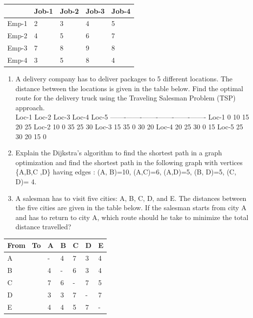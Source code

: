 \documentclass[
  letterpaper,
  DIV=11,
  numbers=noendperiod]{scrreprt}
\begin{document}
\begin{longtable}[]{@{}lllll@{}}
\toprule\noalign{}
& Job-1 & Job-2 & Job-3 & Job-4 \\
\midrule\noalign{}
\endhead
\bottomrule\noalign{}
\endlastfoot
Emp-1 & 2 & 3 & 4 & 5 \\
Emp-2 & 4 & 5 & 6 & 7 \\
Emp-3 & 7 & 8 & 9 & 8 \\
Emp-4 & 3 & 5 & 8 & 4 \\
\end{longtable}

\begin{enumerate}
\def\labelenumi{\arabic{enumi}.}
\setcounter{enumi}{8}
\item
  A delivery company has to deliver packages to 5 different locations.
  The distance between the locations is given in the table below. Find
  the optimal route for the delivery truck using the Traveling Salesman
  Problem (TSP) approach.\\
  \textbar{} \textbar{} Loc-1 \textbar{} Loc-2 \textbar{} Loc-3
  \textbar{} Loc-4 \textbar{} Loc-5 \textbar{}
  \textbar-------\textbar-------\textbar-------\textbar-------\textbar-------\textbar-------\textbar{}
  \textbar{} Loc-1 \textbar{} 0 \textbar{} 10 \textbar{} 15 \textbar{}
  20 \textbar{} 25 \textbar{} \textbar{} Loc-2 \textbar{} 10 \textbar{}
  0 \textbar{} 35 \textbar{} 25 \textbar{} 30 \textbar{} \textbar{}
  Loc-3 \textbar{} 15 \textbar{} 35 \textbar{} 0 \textbar{} 30
  \textbar{} 20 \textbar{} \textbar{} Loc-4 \textbar{} 20 \textbar{} 25
  \textbar{} 30 \textbar{} 0 \textbar{} 15 \textbar{} \textbar{} Loc-5
  \textbar{} 25 \textbar{} 30 \textbar{} 20 \textbar{} 15 \textbar{} 0
  \textbar{}
\item
  Explain the Dijkstra's algorithm to find the shortest path in a graph
  optimization and find the shortest path in the following graph with
  vertices \{A,B,C ,D\} having edges : (A, B)=10, (A,C)=6, (A,D)=5, (B,
  D)=5, (C, D)= 4.
\item
  A salesman has to visit five cities: A, B, C, D, and E. The distances
  between the five cities are given in the table below. If the salesman
  starts from city A and has to return to city A, which route should he
  take to minimize the total distance travelled?
\end{enumerate}

\begin{longtable}[]{@{}llllll@{}}
\toprule\noalign{}
From ~To & A & B & C & D & E \\
\midrule\noalign{}
\endhead
\bottomrule\noalign{}
\endlastfoot
A & - & 4 & 7 & 3 & 4 \\
B & 4 & - & 6 & 3 & 4 \\
C & 7 & 6 & - & 7 & 5 \\
D & 3 & 3 & 7 & - & 7 \\
E & 4 & 4 & 5 & 7 & - \\
\end{longtable}
\end{document}
